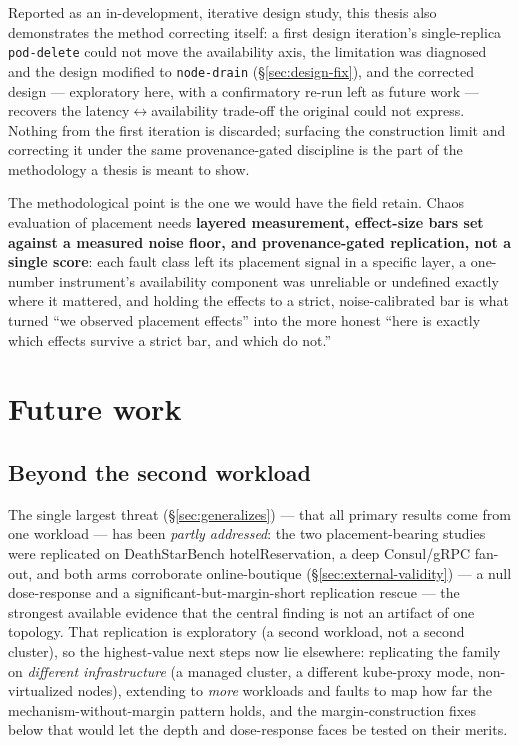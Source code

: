 Reported as an in-development, iterative design study, this thesis also
demonstrates the method correcting itself: a first design iteration's
single-replica \texttt{pod-delete} could not move the availability axis, the
limitation was diagnosed and the design modified to \texttt{node-drain}
(\S\ref{sec:design-fix}), and the corrected design --- exploratory here, with a
confirmatory re-run left as future work --- recovers the
latency$\leftrightarrow$availability trade-off the original could not express.
Nothing from the first iteration is discarded; surfacing the construction limit
and correcting it under the same provenance-gated discipline is
the part of the methodology a thesis is meant to show.

The methodological point is the one we would have the field retain. Chaos
evaluation of placement needs \textbf{layered measurement, effect-size bars set
against a measured noise floor, and provenance-gated replication, not a single
score}: each fault class left its placement signal in a specific layer, a
one-number instrument's availability component was unreliable or undefined
exactly where it mattered, and holding the effects to a strict, noise-calibrated
bar is what turned ``we observed placement effects'' into the more honest ``here
is exactly which effects survive a strict bar, and which do not.''

\section{Future work}\label{sec:future-work}

\subsection*{Beyond the second workload}

The single largest threat (\S\ref{sec:generalizes}) --- that all primary
results come from one workload --- has been \emph{partly addressed}: the two
placement-bearing studies were replicated on DeathStarBench hotelReservation, a
deep Consul/gRPC fan-out, and both arms corroborate online-boutique
(\S\ref{sec:external-validity}) --- a null dose-response and a
significant-but-margin-short replication rescue --- the strongest available
evidence that the central finding is not an artifact of one topology. That
replication is exploratory (a second workload, not a second cluster), so the
highest-value next steps now lie elsewhere: replicating the family on
\emph{different infrastructure} (a managed cluster, a different kube-proxy mode,
non-virtualized nodes), extending to \emph{more} workloads and faults to map how
far the mechanism-without-margin pattern holds, and the margin-construction fixes
below that would let the depth and dose-response faces be tested on their merits.

